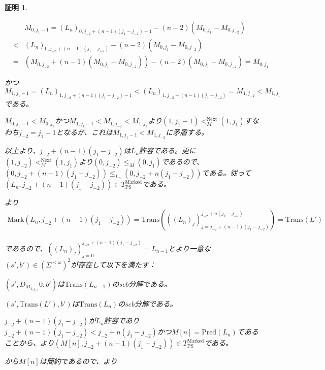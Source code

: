 \documentclass[dvipdfmx,uplatex]{jsarticle}
\theoremstyle{customnonumberbreakfortheorem}
\theoremstyle{customnonumberbreakforproof}
\newtheorem{hideableproof}{証明}
\begin{document}
\begin{hideableproof}
\begin{indented}
\begin{indented}
			\begin{eqnarray*}
			& & M_{0,j_1-1} = (L_n)_{0,j_{-2}+(n-1)(j_1-j_{-2})-1}-(n-2)(M_{0,j_1}-M_{0,j_{-2}}) \\
			& < & (L_n)_{0,j_{-2}+(n-1)(j_1-j_{-2})}-(n-2)(M_{0,j_1}-M_{0,j_{-2}}) \\
			& = & (M_{0,j_{-2}}+(n-1)(M_{0,j_1}-M_{0,j_{-2}}))-(n-2)(M_{0,j_1}-M_{0,j_{-2}}) = M_{0,j_1}
			\end{eqnarray*}
			\item かつ\(M_{1,j_1-1} = (L_n)_{1,j_{-2}+(n-1)(j_1-j_{-2})-1} < (L_n)_{1,j_{-2}+(n-1)(j_1-j_{-2})} = M_{1,j_{-2}} < M_{1,j_1}\)である。
			\item \(M_{0,j_1-1} < M_{0,j_1}\)かつ\(M_{1,j_1-1} < M_{1,j_{-2}} < M_{1,j_1}\)より\((1,j_1-1) <_M^{\textrm{Next}} (1,j_1)\)すなわち\(j_{-2} = j_1-1\)となるが、これは\(M_{1,j_1-1} < M_{1,j_{-2}}\)に矛盾する。
		\end{indented}
		\item 以上より、\(j_{-2}+(n-1)(j_1-j_{-2})\)は\(L_n\)許容である。更に\((1,j_{-2}) <_M^{\textrm{Next}} (1,j_1)\)より\((0,j_{-2}) \leq_M (0,j_1)\)であるので、\((0,j_{-2}+(n-1)(j_1-j_{-2})) \leq_{L_n} (0,j_{-2}+n(j_1-j_{-2}))\)である。従って\((L_n,j_{-2}+(n-1)(j_1-j_{-2})) \in T_{\textrm{PS}}^{\textrm{Marked}}\)である。
		\item {}より
		\begin{eqnarray*}
		\textrm{Mark}(L_n,j_{-2}+(n-1)(j_1-j_{-2})) = \textrm{Trans}(((L_n)_j)_{j=j_{-2}+(n-1)(j_1-j_{-2})}^{j_{-2}+n(j_1-j_{-2})}) = \textrm{Trans}(L')
		\end{eqnarray*}
		\item であるので、\(((L_n)_j)_{j=0}^{j_{-2}+(n-1)(j_1-j_{-2})} = L_{n-1}\)とより一意な\((s',b') \in (\Sigma^{< \omega})^2\)が存在して以下を満たす：
		\begin{penumerate}
			\item \((s',D_{M_{1,j_{-2}}} 0,b')\)は\(\textrm{Trans}(L_{n-1})\)のscb分解である。
			\item \((s',\textrm{Trans}(L'),b')\)は\(\textrm{Trans}(L_n)\)のscb分解である。
		\end{penumerate}
		\item \(j_{-2}+(n-1)(j_1-j_{-2})\)が\(L_n\)許容であり\(j_{-2}+(n-1)(j_1-j_{-2}) < j_{-2}+n(j_1-j_{-2})\)かつ\(M[n] = \textrm{Pred}(L_n)\)であることから、より\((M[n],j_{-2}+(n-1)(j_1-j_{-2})) \in T_{\textrm{PS}}^{\textrm{Marked}}\)である。
		\item {}から\(M[n]\)は簡約であるので、より

\end{indented}
\end{hideableproof}
\end{document}
